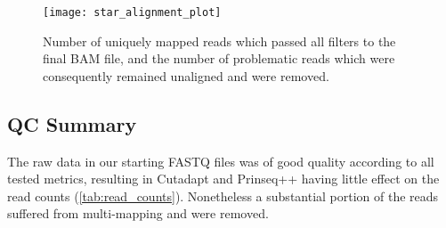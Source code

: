 \begin{figure}[!h]
    \centering
    \texttt{[image: star\_alignment\_plot]}
    \caption{Number of uniquely mapped reads which passed all filters to the final BAM file, and the number of problematic reads which were consequently remained unaligned and were removed.} 
    \label{fig:star_alignment_plot}
\end{figure}
\newpage





\subsection{QC Summary}



The raw data in our starting FASTQ files was of good quality according to all tested metrics, resulting in Cutadapt and Prinseq++ having little effect on the read counts (\autoref{tab:read_counts}). Nonetheless a substantial portion of the reads suffered from multi-mapping and were removed.

